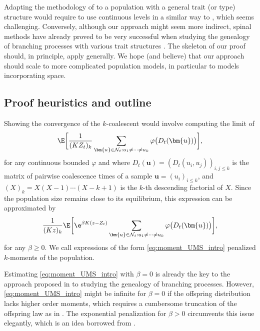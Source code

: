 \begin{refsegment}
Adapting the methodology of \cite{garrett2025} to a population with a general trait
(or type) structure would require to use continuous levels in a similar way
to \cite{Kurtz2011, Etheridge2014}, which seems challenging. Conversely,
although our approach might seem more indirect, spinal methods have
already proved to be very successful when studying the genealogy of
branching processes with various trait structures
\citep{harris_coalescent_2020,
foutelrodier2024momentapproachconvergencespatial, schertzer2023spectral,
FST_Semipushed_2024, harris_universality_2024, harris_coalescent_2024,
boenkost2022genealogy, Johnston2019}. The skeleton of our proof should,
in principle, apply generally. We hope (and believe) that our approach
should scale to more complicated population models, in particular to
models incorporating space. 

\subsection{Proof heuristics and outline}

Showing the convergence of the $k$-coalescent would involve computing the
limit of 
\[
    \E\bigg[ 
        \frac{1}{(KZ_t)_k} 
        \sum_{\bm{u} \in \mathcal{N}_t:u_1\neq \cdots\neq u_k} 
        \varphi\big(D_t(\bm{u})\big) \bigg],
\]
for any continuous bounded $\varphi$ and where $D_t(\bm{u}) =
(D_t(u_i, u_j))_{i,j \leqslant k}$ is the matrix of pairwise coalescence times
of a sample $\bm{u} = (u_i)_{i \leqslant k}$, and $(X)_k = X(X-1)\cdots(X-k+1)$
is the $k$-th descending factorial of $X$. Since the population size
remains close to its equilibrium, this expression can be approximated by
\begin{equation}\label{eq:moment_UMS_intro} 
    \frac{1}{(Kz)_k} 
    \E\bigg[\e^{\beta K(z-Z_t)} 
        \sum_{\bm{u} \in \mathcal{N}_t:u_1\neq \cdots\neq u_k} 
        \varphi\big(D_t(\bm{u})\big)
    \bigg],
\end{equation}
for any $\beta \geqslant 0$. We call expressions of the form
\eqref{eq:moment_UMS_intro} penalized $k$-moments of the population. 

\begin{rem}\label{rem:beta}
    Estimating \eqref{eq:moment_UMS_intro} with $\beta = 0$ is already
    the key to the approach proposed in \citet*{Foutel_Schertzer} to
    studying the genealogy of branching processes. However,
    \eqref{eq:moment_UMS_intro} might be infinite for $\beta=0$ if the
    offspring distribution lacks higher order moments, which requires a
    cumbersome truncation of the offspring law as in \cite{harris_coalescent_2020, 
    boenkost2022genealogy}. The exponential penalization for $\beta > 0$
    circumvents this issue elegantly, which is an idea borrowed from
    \citet*{harris_coalescent_2024}.
\end{rem}


\end{refsegment}
